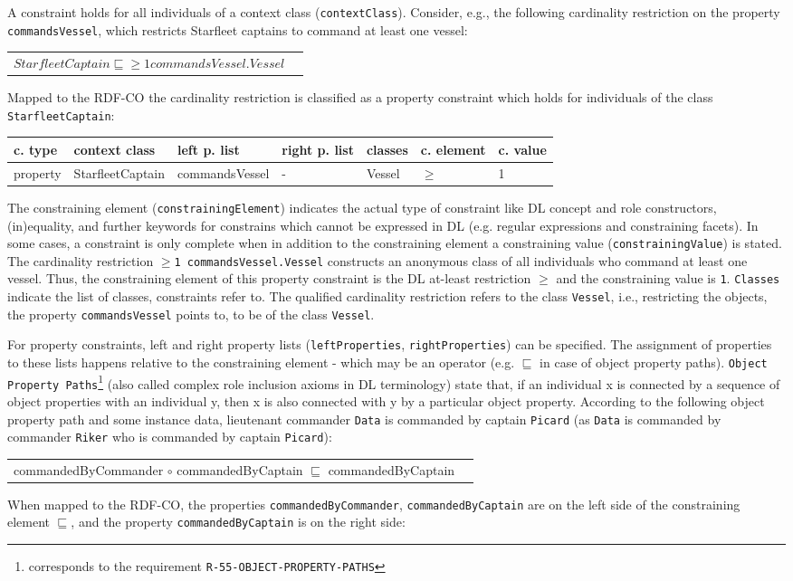 \documentclass{llncs}
\newcommand{\ms}[1]{\texttt{#1}}
\newenvironment{gcotable}{
  \scriptsize
  \sffamily
  \vspace{0.3cm}
	\begin{center}
  \begin{tabular}{l|l|l|l|l|l|l}
  \hline
  \textbf{c. type} & \textbf{context class} & \textbf{left p. list} & \textbf{right p. list} & \textbf{classes} & \textbf{c. element} & \textbf{c. value} \\
  \hline

}{
  \hline
  \end{tabular}
	\end{center}
}
\newenvironment{DL}{
  \vspace{0.3cm}
	\begin{center}
  \begin{tabular}{r l}

}{
  \end{tabular}
	\end{center}
}
\begin{document}
A constraint holds for all individuals of a context class (\ms{contextClass}).
Consider, e.g., the following cardinality restriction on the property \ms{commandsVessel}, which restricts Starfleet captains to command at least one vessel: 
\begin{DL}
$StarfleetCaptain \sqsubseteq \geq1 commandsVessel . Vessel $
\end{DL}
Mapped to the RDF-CO the cardinality restriction is classified as a property constraint which holds for individuals of the class \ms{StarfleetCaptain}:
\begin{gcotable}
property & StarfleetCaptain & commandsVessel & - & Vessel & $\geq$ & 1 \\
\end{gcotable}
The constraining element (\ms{constrainingElement}) indicates the actual type of constraint like DL concept and role constructors, (in)equality, and further keywords for constrains which cannot be expressed in DL (e.g. regular expressions and constraining facets).
In some cases, a constraint is only complete when in addition to the constraining element a constraining value (\ms{constrainingValue}) is stated.
The cardinality restriction 
\ms{$\geq$1 commandsVessel.Vessel}
constructs an anonymous class of all individuals who command at least one vessel.
Thus, the constraining element of this property constraint is the DL at-least restriction \ms{$\geq$} and the constraining value is \ms{1}.
\ms{Classes} indicate the list of classes, constraints refer to.
The qualified cardinality restriction refers to the class \ms{Vessel}, 
i.e., restricting the objects, the property \ms{commandsVessel} points to, to be of the class \ms{Vessel}.

For property constraints, left and right property lists (\ms{leftProperties}, \ms{rightProperties}) can be specified.
The assignment of properties to these lists happens relative to the constraining element - which may be an operator (e.g. $\sqsubseteq$ in case of object property paths).
\ms{Object Property Paths}\footnote{corresponds to the requirement \ms{R-55-OBJECT-PROPERTY-PATHS}} (also called complex role inclusion axioms in DL terminology)
state that, if an individual x is connected by a sequence of object properties with an individual y, 
then x is also connected with y by a particular object property. 
According to the following object property path and some instance data, lieutenant commander \ms{Data} is commanded by captain \ms{Picard} 
(as \ms{Data} is commanded by commander \ms{Riker} who is commanded by captain \ms{Picard}):
\begin{DL}
commandedByCommander $\circ$ commandedByCaptain $\sqsubseteq$ commandedByCaptain 
\end{DL}
When mapped to the RDF-CO, the properties \ms{commandedByCommander}, \ms{commandedByCaptain} are on the left side of the constraining element \ms{$\sqsubseteq$},
and the property \ms{commandedByCaptain} is on the right side:
\end{document}
